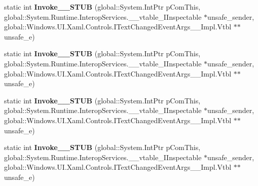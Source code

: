 \begin{DoxyCompactItemize}
\item 
\mbox{\label{struct_windows_1_1_u_i_1_1_xaml_1_1_controls_1_1_text_changed_event_handler_____impl_1_1_vtbl_a5f23308fc081d806e79e4d89b7db8027}} 
static int {\bfseries Invoke\+\_\+\+\_\+\+S\+T\+UB} (global\+::\+System.\+Int\+Ptr p\+Com\+This, global\+::\+System.\+Runtime.\+Interop\+Services.\+\_\+\+\_\+vtable\+\_\+\+I\+Inspectable $\ast$unsafe\+\_\+sender, global\+::\+Windows.\+U\+I.\+Xaml.\+Controls.\+I\+Text\+Changed\+Event\+Args\+\_\+\+\_\+\+Impl.\+Vtbl $\ast$$\ast$unsafe\+\_\+e)
\item 
\mbox{\label{struct_windows_1_1_u_i_1_1_xaml_1_1_controls_1_1_text_changed_event_handler_____impl_1_1_vtbl_a5f23308fc081d806e79e4d89b7db8027}} 
static int {\bfseries Invoke\+\_\+\+\_\+\+S\+T\+UB} (global\+::\+System.\+Int\+Ptr p\+Com\+This, global\+::\+System.\+Runtime.\+Interop\+Services.\+\_\+\+\_\+vtable\+\_\+\+I\+Inspectable $\ast$unsafe\+\_\+sender, global\+::\+Windows.\+U\+I.\+Xaml.\+Controls.\+I\+Text\+Changed\+Event\+Args\+\_\+\+\_\+\+Impl.\+Vtbl $\ast$$\ast$unsafe\+\_\+e)
\item 
\mbox{\label{struct_windows_1_1_u_i_1_1_xaml_1_1_controls_1_1_text_changed_event_handler_____impl_1_1_vtbl_a5f23308fc081d806e79e4d89b7db8027}} 
static int {\bfseries Invoke\+\_\+\+\_\+\+S\+T\+UB} (global\+::\+System.\+Int\+Ptr p\+Com\+This, global\+::\+System.\+Runtime.\+Interop\+Services.\+\_\+\+\_\+vtable\+\_\+\+I\+Inspectable $\ast$unsafe\+\_\+sender, global\+::\+Windows.\+U\+I.\+Xaml.\+Controls.\+I\+Text\+Changed\+Event\+Args\+\_\+\+\_\+\+Impl.\+Vtbl $\ast$$\ast$unsafe\+\_\+e)
\item 
\mbox{\label{struct_windows_1_1_u_i_1_1_xaml_1_1_controls_1_1_text_changed_event_handler_____impl_1_1_vtbl_a5f23308fc081d806e79e4d89b7db8027}} 
static int {\bfseries Invoke\+\_\+\+\_\+\+S\+T\+UB} (global\+::\+System.\+Int\+Ptr p\+Com\+This, global\+::\+System.\+Runtime.\+Interop\+Services.\+\_\+\+\_\+vtable\+\_\+\+I\+Inspectable $\ast$unsafe\+\_\+sender, global\+::\+Windows.\+U\+I.\+Xaml.\+Controls.\+I\+Text\+Changed\+Event\+Args\+\_\+\+\_\+\+Impl.\+Vtbl $\ast$$\ast$unsafe\+\_\+e)

\end{DoxyCompactItemize}
